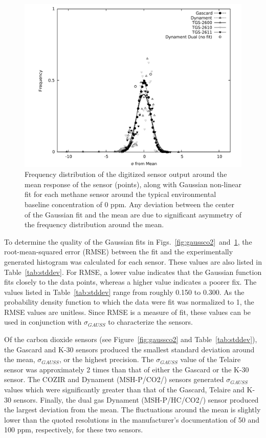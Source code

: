 \documentclass[times]{joehreview}
\begin{document}
	\begin{figure}[!t]
		\centering
		\includegraphics[width=\columnwidth]{honey8.pdf}
		\caption{Frequency distribution of the digitized sensor output around the mean response of the sensor (points), along with Gaussian non-linear fit for each methane sensor around the typical environmental baseline concentration of 0 ppm.  Any deviation between the center of the Gaussian fit and the mean are due to significant asymmetry of the frequency distribution around the mean.}
		\label{fig:gaussch4}
	\end{figure}
	
	To determine the quality of the Gaussian fits in Figs.~\ref{fig:gaussco2}~and~\ref{fig:gaussch4}, the root-mean-squared error (RMSE)  between the fit and the experimentally generated histogram was calculated for each sensor.  These values are also listed in Table~\ref{tab:stddev}.  For RMSE, a lower value indicates that the Gaussian function fits closely to the data points, whereas a higher value indicates a poorer fix.   The values listed in Table~\ref{tab:stddev} range from roughly 0.150 to 0.300.  As the probability density function to which the data were fit was normalized to 1, the RMSE values are unitless.  Since RMSE is a measure of fit, these values can be used in conjunction with $\sigma_{GAUSS}$ to characterize the sensors.
	
	Of the carbon dioxide sensors (see Figure~\ref{fig:gaussco2} and Table~\ref{tab:stddev}), the Gascard and K-30 sensors produced the smallest standard deviation around the mean, $\sigma_{GAUSS}$, or the highest precision.  The $\sigma_{GAUSS}$ value of the Telaire sensor was approximately 2 times than that of either the Gascard or the K-30 sensor.  The COZIR and Dynament (MSH-P/CO2/) sensors generated $\sigma_{GAUSS}$ values which were significantly greater than that of the Gascard, Telaire and K-30 sensors.  Finally, the dual gas Dynament (MSH-P/HC/CO2/) sensor produced the largest deviation from the mean. The fluctuations around the mean is slightly lower than the quoted resolutions in the manufacturer's documentation of 50 and 100 ppm, respectively, for these two sensors.
	
\end{document}
